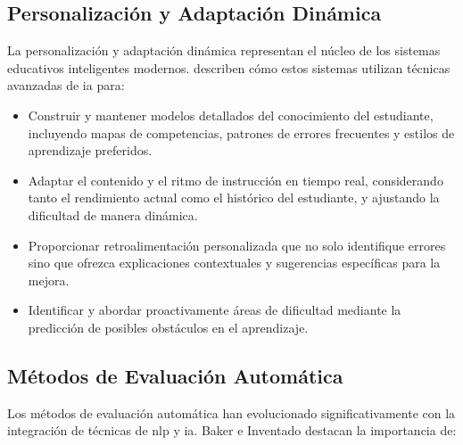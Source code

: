 \subsection{Personalización y Adaptación Dinámica}
La personalización y adaptación dinámica representan el núcleo de los sistemas educativos inteligentes modernos. \cite{roll2018learning} describen cómo estos sistemas utilizan técnicas avanzadas de \gls{ia} para:

\begin{itemize}
  \item Construir y mantener modelos detallados del conocimiento del estudiante, incluyendo mapas de competencias, patrones de errores frecuentes y estilos de aprendizaje preferidos.

  \item Adaptar el contenido y el ritmo de instrucción en tiempo real, considerando tanto el rendimiento actual como el histórico del estudiante, y ajustando la dificultad de manera dinámica.

  \item Proporcionar retroalimentación personalizada que no solo identifique errores sino que ofrezca explicaciones contextuales y sugerencias específicas para la mejora.

  \item Identificar y abordar proactivamente áreas de dificultad mediante la predicción de posibles obstáculos en el aprendizaje.
\end{itemize}

\subsection{Métodos de Evaluación Automática}

Los métodos de evaluación automática han evolucionado significativamente con la integración de técnicas de \gls{nlp} y \gls{ia}. Baker e Inventado \cite{baker2014educational} destacan la importancia de:

